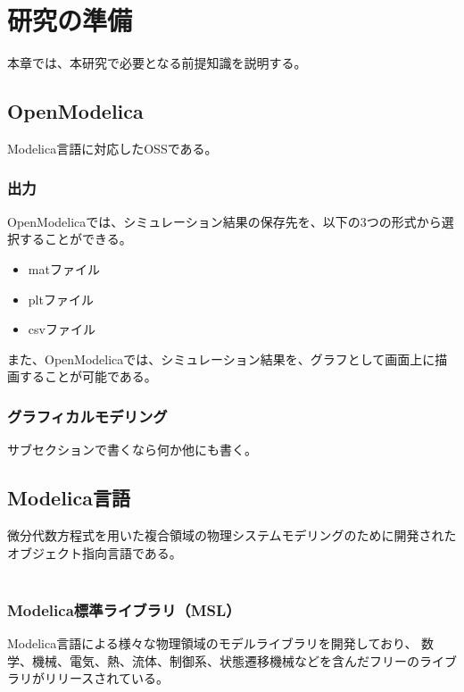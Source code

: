 \chapter{研究の準備}\label{cha:Preparation}
本章では、本研究で必要となる前提知識を説明する。



\section{OpenModelica}\label{OM}
Modelica言語に対応したOSSである\cite{fritzson2006openmodelica}。

\subsection{出力}\label{output}
OpenModelicaでは、シミュレーション結果の保存先を、以下の3つの形式から選択することができる。

\begin{itemize}
    \item matファイル
    \item pltファイル
    \item csvファイル
\end{itemize}

また、OpenModelicaでは、シミュレーション結果を、グラフとして画面上に描画することが可能である。

\subsection{グラフィカルモデリング}\label{glafical}
サブセクションで書くなら何か他にも書く。

\section{Modelica言語}\label{modelica}
微分代数方程式を用いた複合領域の物理システムモデリングのために開発されたオブジェクト指向言語である。\\
　\subsection{Modelica標準ライブラリ（MSL）}\label{MSL}
        Modelica言語による様々な物理領域のモデルライブラリを開発しており、
        数学、機械、電気、熱、流体、制御系、状態遷移機械などを含んだフリーのライブラリがリリースされている。

